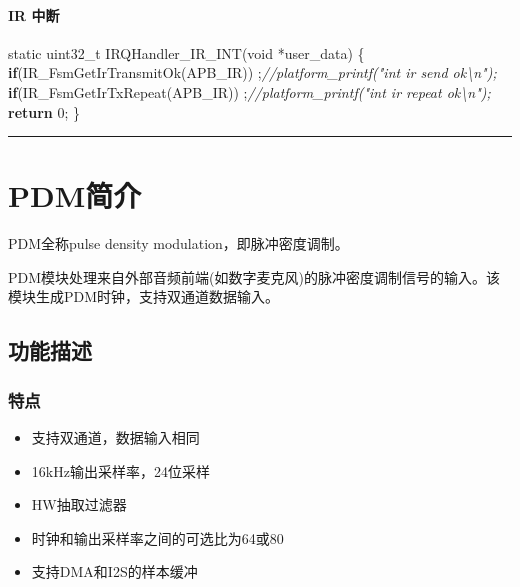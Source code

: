 \documentclass[
  12pt,
]{book}
\newenvironment{Shaded}{\begin{snugshade}}{\end{snugshade}}
\newcommand{\CommentTok}[1]{\textcolor[rgb]{0.56,0.35,0.01}{\textit{#1}}}
\newcommand{\ControlFlowTok}[1]{\textcolor[rgb]{0.13,0.29,0.53}{\textbf{#1}}}
\newcommand{\DataTypeTok}[1]{\textcolor[rgb]{0.13,0.29,0.53}{#1}}
\newcommand{\DecValTok}[1]{\textcolor[rgb]{0.00,0.00,0.81}{#1}}
\newcommand{\NormalTok}[1]{#1}
\begin{document}
\hypertarget{ir-ux4e2dux65ad}{%
\subsubsection{IR 中断}\label{ir-ux4e2dux65ad}}

\begin{Shaded}
\begin{Highlighting}[]
\DataTypeTok{static} \DataTypeTok{uint32_t}\NormalTok{ IRQHandler_IR_INT(}\DataTypeTok{void}\NormalTok{ *user_data)}
\NormalTok{\{}
    \ControlFlowTok{if}\NormalTok{(IR_FsmGetIrTransmitOk(APB_IR))}
\NormalTok{        ;}\CommentTok{//platform_printf("int ir send ok\textbackslash{}n");}
    \ControlFlowTok{if}\NormalTok{(IR_FsmGetIrTxRepeat(APB_IR))}
\NormalTok{        ;}\CommentTok{//platform_printf("int ir repeat ok\textbackslash{}n");}
    \ControlFlowTok{return} \DecValTok{0}\NormalTok{;}
\NormalTok{\}}
\end{Highlighting}
\end{Shaded}

\begin{center}\rule{0.5\linewidth}{0.5pt}\end{center}

\hypertarget{ch-PDM}{%
\chapter{PDM简介}\label{ch-PDM}}

PDM全称pulse density modulation，即脉冲密度调制。

PDM模块处理来自外部音频前端(如数字麦克风)的脉冲密度调制信号的输入。该模块生成PDM时钟，支持双通道数据输入。

\hypertarget{ux529fux80fdux63cfux8ff0-2}{%
\section{功能描述}\label{ux529fux80fdux63cfux8ff0-2}}

\hypertarget{ux7279ux70b9-2}{%
\subsection{特点}\label{ux7279ux70b9-2}}

\begin{itemize}
\item
  支持双通道，数据输入相同
\item
  16kHz输出采样率，24位采样
\item
  HW抽取过滤器
\item
  时钟和输出采样率之间的可选比为64或80
\item
  支持DMA和I2S的样本缓冲
\end{itemize}
\end{document}
